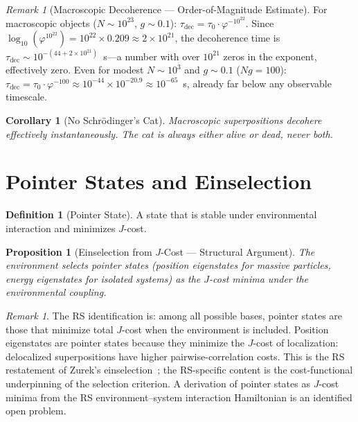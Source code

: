 \documentclass[12pt,a4paper]{article}
\newtheorem{corollary}[theorem]{Corollary}
\newtheorem{proposition}[theorem]{Proposition}
\theoremstyle{definition}
\newtheorem{definition}[theorem]{Definition}
\theoremstyle{remark}
\newtheorem{remark}[theorem]{Remark}
\begin{document}
\begin{remark}[Macroscopic Decoherence --- Order-of-Magnitude Estimate]
For macroscopic objects ($N \sim 10^{23}$, $g \sim 0.1$):
$\tau_{\mathrm{dec}} = \tau_0 \cdot \varphi^{-10^{22}}$.
Since $\log_{10}(\varphi^{10^{22}}) = 10^{22} \times 0.209
\approx 2 \times 10^{21}$, the decoherence time is
$\tau_{\mathrm{dec}} \sim 10^{-(44 + 2 \times 10^{21})}$~s---a
number with over $10^{21}$ zeros in the exponent, effectively zero.
Even for modest $N \sim 10^3$ and $g \sim 0.1$
($Ng = 100$): $\tau_{\mathrm{dec}} = \tau_0 \cdot \varphi^{-100}
\approx 10^{-44} \times 10^{-20.9} \approx 10^{-65}$~s, already
far below any observable timescale.
\end{remark}

\begin{corollary}[No Schr\"odinger's Cat]
Macroscopic superpositions decohere effectively
instantaneously.  The cat is always either alive or dead,
never both.
\end{corollary}

\section{Pointer States and Einselection}

\begin{definition}[Pointer State]
A state that is stable under environmental interaction and minimizes
$J$-cost.
\end{definition}

\begin{proposition}[Einselection from $J$-Cost --- Structural Argument]
The environment selects pointer states (position eigenstates for
massive particles, energy eigenstates for isolated systems) as the
$J$-cost minima under the environmental coupling.
\end{proposition}

\begin{remark}
The RS identification is: among all possible bases, pointer states are
those that minimize total $J$-cost when the environment is included.
Position eigenstates are pointer states because they minimize the
$J$-cost of localization: delocalized superpositions have higher
pairwise-correlation costs.  This is the RS restatement of Zurek's
einselection~\cite{Zurek}; the RS-specific content is the
cost-functional underpinning of the selection criterion.  A
derivation of pointer states as $J$-cost minima from the RS
environment--system interaction Hamiltonian is an identified open
problem.
\end{remark}
\end{document}
